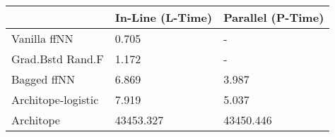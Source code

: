 \begin{tabular}{lll}
\toprule
{} & In-Line (L-Time) & Parallel (P-Time) \\
\midrule
Vanilla ffNN       &            0.705 &                 - \\
Grad.Bstd Rand.F   &            1.172 &                 - \\
Bagged ffNN        &            6.869 &             3.987 \\
Architope-logistic &            7.919 &             5.037 \\
Architope          &        43453.327 &         43450.446 \\
\bottomrule
\end{tabular}
